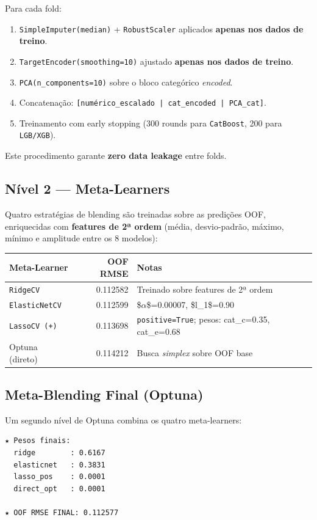 \documentclass[12pt,a4paper]{article}
\begin{document}
Para cada fold:

\begin{enumerate}
\item \texttt{SimpleImputer(median)} + \texttt{RobustScaler} aplicados \textbf{apenas nos dados de treino}.
\item \texttt{TargetEncoder(smoothing=10)} ajustado \textbf{apenas nos dados de treino}.
\item \texttt{PCA(n\_components=10)} sobre o bloco categórico \emph{encoded}.
\item Concatenação: \texttt{[numérico\_escalado | cat\_encoded | PCA\_cat]}.
\item Treinamento com early stopping (300 rounds para \texttt{CatBoost}, 200 para \texttt{LGB/XGB}).
\end{enumerate}

Este procedimento garante \textbf{zero data leakage} entre folds.
\subsection{Nível 2 — Meta-Learners}
\label{sec:org30e4ae5}

Quatro estratégias de blending são treinadas sobre as predições OOF,
enriquecidas com \textbf{features de 2ª ordem} (média, desvio-padrão, máximo, mínimo
e amplitude entre os 8 modelos):

\begin{center}
\begin{tabular}{lrl}
Meta-Learner & OOF RMSE & Notas\\
\hline
\texttt{RidgeCV} & 0.112582 & Treinado sobre features de 2ª ordem\\
\texttt{ElasticNetCV} & 0.112599 & \$\(\alpha\)\$=0.00007, \$l\_1\$=0.90\\
\texttt{LassoCV (+)} & 0.113698 & \texttt{positive=True}; pesos: cat\_c=0.35, cat\_e=0.68\\
Optuna (direto) & 0.114212 & Busca \emph{simplex} sobre OOF base\\
\end{tabular}
\end{center}
\subsection{Meta-Blending Final (Optuna)}
\label{sec:org42197cc}

Um segundo nível de Optuna combina os quatro meta-learners:

\begin{verbatim}
★ Pesos finais:
  ridge        : 0.6167
  elasticnet   : 0.3831
  lasso_pos    : 0.0001
  direct_opt   : 0.0001

★ OOF RMSE FINAL: 0.112577
\end{verbatim}
\end{document}
